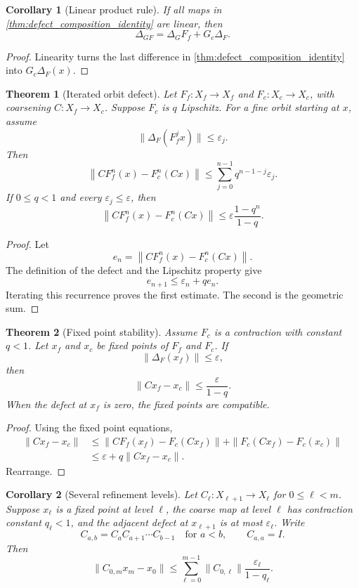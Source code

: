 \documentclass{aomart}
\newtheorem{theorem}{Theorem}[section]
\newtheorem{corollary}[corollary]{Corollary}
\theoremstyle{definition}
\theoremstyle{remark}
\begin{document}
\begin{corollary}[Linear product rule]\label{cor:linear_defect_product}
If all maps in \cref{thm:defect_composition_identity} are linear, then
\[
\Delta_{GF}
=
\Delta_G F_f+G_c\Delta_F.
\]
\end{corollary}

\begin{proof}
Linearity turns the last difference in \cref{thm:defect_composition_identity} into $G_c\Delta_F(x)$.
\end{proof}

\begin{theorem}[Iterated orbit defect]\label{thm:iterated_orbit_defect}
Let $F_f:X_f\to X_f$ and $F_c:X_c\to X_c$, with coarsening $C:X_f\to X_c$.  Suppose $F_c$ is $q$ Lipschitz.  For a fine orbit starting at $x$, assume
\[
\|\Delta_F(F_f^j x)\|\le\varepsilon_j.
\]
Then
\[
\left\|CF_f^n(x)-F_c^n(Cx)\right\|
\le
\sum_{j=0}^{n-1}q^{n-1-j}\varepsilon_j.
\]
If $0\le q<1$ and every $\varepsilon_j\le\varepsilon$, then
\[
\left\|CF_f^n(x)-F_c^n(Cx)\right\|
\le
\varepsilon\frac{1-q^n}{1-q}.
\]
\end{theorem}

\begin{proof}
Let
\[
e_n=\left\|CF_f^n(x)-F_c^n(Cx)\right\|.
\]
The definition of the defect and the Lipschitz property give
\[
e_{n+1}\le\varepsilon_n+qe_n.
\]
Iterating this recurrence proves the first estimate.  The second is the geometric sum.
\end{proof}

\begin{theorem}[Fixed point stability]\label{thm:fixed_point_stability}
Assume $F_c$ is a contraction with constant $q<1$.  Let $x_f$ and $x_c$ be fixed points of $F_f$ and $F_c$.  If
\[
\|\Delta_F(x_f)\|\le\varepsilon,
\]
then
\[
\|Cx_f-x_c\|
\le
\frac{\varepsilon}{1-q}.
\]
When the defect at $x_f$ is zero, the fixed points are compatible.
\end{theorem}

\begin{proof}
Using the fixed point equations,
\[
\begin{aligned}
\|Cx_f-x_c\|
&\le
\|CF_f(x_f)-F_c(Cx_f)\|
+
\|F_c(Cx_f)-F_c(x_c)\|\\
&\le
\varepsilon+q\|Cx_f-x_c\|.
\end{aligned}
\]
Rearrange.
\end{proof}

\begin{corollary}[Several refinement levels]\label{cor:multilevel_fixed_points}
Let $C_\ell:X_{\ell+1}\to X_\ell$ for $0\le\ell<m$.  Suppose $x_\ell$ is a fixed point at level $\ell$, the coarse map at level $\ell$ has contraction constant $q_\ell<1$, and the adjacent defect at $x_{\ell+1}$ is at most $\varepsilon_\ell$.  Write
\[
C_{a,b}=C_aC_{a+1}\cdots C_{b-1}
\quad\text{for }a<b,
\qquad
C_{a,a}=I.
\]
Then
\[
\|C_{0,m}x_m-x_0\|
\le
\sum_{\ell=0}^{m-1}
\|C_{0,\ell}\|
\frac{\varepsilon_\ell}{1-q_\ell}.
\]
\end{corollary}
\end{document}
